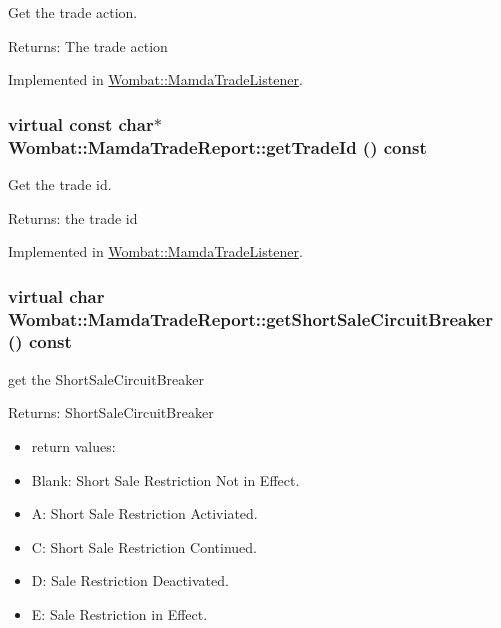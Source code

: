 Get the trade action. 

\begin{Desc}
\item[Returns:]The trade action \end{Desc}


Implemented in \hyperlink{classWombat_1_1MamdaTradeListener_9201b4749efd0f17dc42abf5c2bc2060}{Wombat::Mamda\-Trade\-Listener}.\hypertarget{classWombat_1_1MamdaTradeReport_8bccbbb68ce93d26fd87db95f2f7ff26}{
\subsubsection[getTradeId]{\setlength{\rightskip}{0pt plus 5cm}virtual const char$\ast$ Wombat::Mamda\-Trade\-Report::get\-Trade\-Id () const}}
\label{classWombat_1_1MamdaTradeReport_8bccbbb68ce93d26fd87db95f2f7ff26}


Get the trade id. 

\begin{Desc}
\item[Returns:]the trade id \end{Desc}


Implemented in \hyperlink{classWombat_1_1MamdaTradeListener_4dcba79f4a1e795b26c382b80b6f18b5}{Wombat::Mamda\-Trade\-Listener}.\hypertarget{classWombat_1_1MamdaTradeReport_e772189728321b1bd833baf28e387c15}{
\subsubsection[getShortSaleCircuitBreaker]{\setlength{\rightskip}{0pt plus 5cm}virtual char Wombat::Mamda\-Trade\-Report::get\-Short\-Sale\-Circuit\-Breaker () const}}
\label{classWombat_1_1MamdaTradeReport_e772189728321b1bd833baf28e387c15}


get the Short\-Sale\-Circuit\-Breaker 

\begin{Desc}
\item[Returns:]Short\-Sale\-Circuit\-Breaker \begin{itemize}
\item return values: \item Blank: Short Sale Restriction Not in Effect. \item A: Short Sale Restriction Activiated. \item C: Short Sale Restriction Continued. \item D: Sale Restriction Deactivated. \item E: Sale Restriction in Effect. \end{itemize}
\end{Desc}


